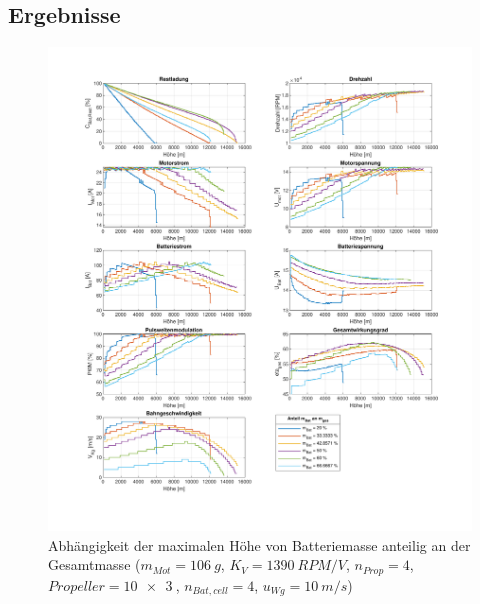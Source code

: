 \subsection{Ergebnisse}
\newpage
\begin{figure}[H]
	\includegraphics[scale=0.70]{Diagramme/Batteriemasse.pdf}
	\caption{Abhängigkeit der maximalen Höhe von Batteriemasse anteilig an der Gesamtmasse (\ensuremath{m_{Mot}=\SI{106}{g}}, \ensuremath{K_V=\SI{1390}{RPM/V}}, \ensuremath{n_{Prop}=4}, \ensuremath{Propeller=\SI{10x3}{}}, \ensuremath{n_{Bat,cell}=4}, \ensuremath{u_{Wg}=\SI{10}{m/s}})}
	\label{abb:batteriemasse}
\end{figure}

